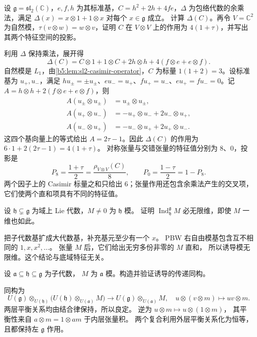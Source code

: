 \begin{exercise}\label{b5:ex:15-enveloping-diagonal}
	设 \(\mathfrak g=\mathfrak{sl}_2(\mathbb C)\)，\(e,f,h\) 为其标准基，\(C=h^2+2h+4fe\)，\(\Delta\) 为包络代数的余乘法，满足 \(\Delta(x)=x\otimes1+1\otimes x\) 对每个 \(x\in\mathfrak g\) 成立。 计算 \(\Delta(C)\)。再令 \(V=\mathbb C^2\) 为自然模，\(\tau(v\otimes w)=w\otimes v\)，证明 \(C\) 在 \(V\otimes V\) 上的作用为 \(4(1+\tau)\)，并写出其两个特征空间的投影。
\end{exercise}
\begin{solution}
	利用 \(\Delta\) 保持乘法，展开得
	\[
		\Delta(C)=C\otimes1+1\otimes C +2h\otimes h+4(f\otimes e+e\otimes f).
	\]
	自然模是 \(L_1\)，由\cref{b5:lem:sl2-casimir-operator}，\(C\) 为标量 \(1(1+2)=3\)。设标准基为 \(u_+,u_-\)，满足 \(hu_\pm=\pm u_\pm\)、\(eu_-=u_+\)、\(fu_+=u_-\)、\(eu_+=fu_-=0\)。记 \(A=h\otimes h+2(f\otimes e+e\otimes f)\)，则
	\[
		\begin{aligned}
			A(u_\pm\otimes u_\pm)&=u_\pm\otimes u_\pm,\\
			A(u_+\otimes u_-)&=-u_+\otimes u_-+2u_-\otimes u_+,\\
			A(u_-\otimes u_+)&=-u_-\otimes u_++2u_+\otimes u_-.
		\end{aligned}
	\]
	这四个基向量上的等式给出 \(A=2\tau-1\)。因此 \(\Delta(C)\) 的作用为 \(6\cdot1+2(2\tau-1)=4(1+\tau)\)。 对称张量与交错张量的特征值分别为 \(8\)、\(0\)，投影是
	\[
		P_8=\frac{1+\tau}{2}=\frac{\rho_{V\otimes V}(C)}8,\qquad P_0=\frac{1-\tau}{2}=1-P_8.
	\]
	两个因子上的 Casimir 标量之和只给出 \(6\)；张量作用还包含余乘法产生的交叉项，它们使两个直和项具有不同的特征值。
\end{solution}

\begin{exercise}\label{b5:ex:15-strict-induction-infinite}
	设 \(\mathfrak h\subsetneq\mathfrak g\) 为域上 Lie 代数，\(M\ne0\) 为 \(\mathfrak h\) 模。 证明 \(\operatorname{Ind}_{\mathfrak h}^{\mathfrak g}M\) 必无限维，即使 \(M\) 一维也如此。
\end{exercise}
\begin{solution}
	把子代数基扩成大代数基，补充基元至少有一个 \(x\)。 PBW 右自由模基包含互不相同的 \(1,x,x^2,\ldots\)。 张量 \(M\) 后，它们给出无穷多份非零的 \(M\) 直和， 所以诱导模无限维。这个结论与底域特征无关。
\end{solution}

\begin{exercise}\label{b5:ex:15-induction-transitivity}
	设 \(\mathfrak a\subseteq\mathfrak h\subseteq\mathfrak g\) 为子代数， \(M\) 为 \(\mathfrak a\) 模。构造并验证诱导的传递同构。
\end{exercise}
\begin{solution}
	同构为
	\[
		U(\mathfrak g)\otimes_{U(\mathfrak h)} \bigl(U(\mathfrak h)\otimes_{U(\mathfrak a)}M\bigr) \longrightarrow U(\mathfrak g)\otimes_{U(\mathfrak a)}M, \quad u\otimes(v\otimes m)\longmapsto uv\otimes m.
	\]
	两层平衡关系均由结合律保持，所以良定。 逆为 \(u\otimes m\mapsto u\otimes(1\otimes m)\)， 其平衡性来自 \(a\otimes m=1\otimes am\) 于内层张量积。 两个复合利用外层平衡关系化为恒等，且都保持左 \(\mathfrak g\) 作用。
\end{solution}

